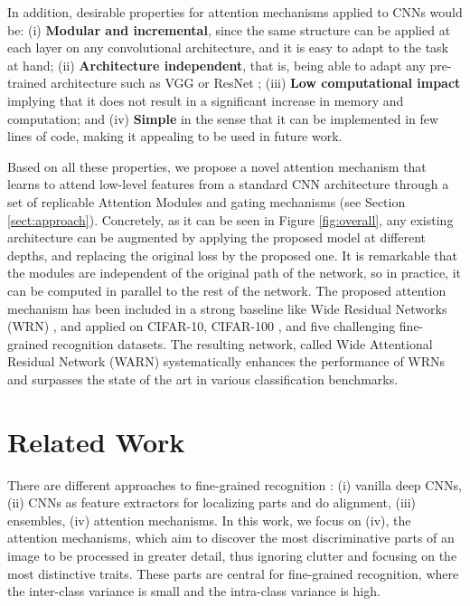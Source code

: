\documentclass[runningheads]{llncs}
\begin{document}
In addition, desirable properties for attention mechanisms applied to CNNs would be: (i) \textbf{Modular and incremental}, since the same structure can be applied at each layer on any convolutional architecture, and it is easy to adapt to the task at hand; (ii) \textbf{Architecture independent}, that is, being able to adapt any pre-trained architecture such as VGG \cite{simonyan2014very} or ResNet \cite{he2016deep}; (iii) \textbf{Low computational impact} implying that it does not result in a significant increase in memory and computation; and (iv) \textbf{Simple} in the sense that it can be implemented in few lines of code, making it appealing to be used in future work.

Based on all these properties, we propose a novel attention mechanism that learns to attend low-level features from a standard CNN architecture through a set of replicable Attention Modules and gating mechanisms (see Section \ref{sect:approach}). Concretely, as it can be seen in Figure \ref{fig:overall}, any existing architecture can be augmented by applying the proposed model at different depths, and replacing the original loss by the proposed one. It is remarkable that the modules are independent of the original path of the network, so in practice, it can be computed in parallel to the rest of the network. The proposed attention mechanism has been included in a strong baseline like Wide Residual Networks (WRN) \cite{Zagoruyko2016WRN}, and applied on CIFAR-10, CIFAR-100 \cite{krizhevsky2009learning}, and five challenging fine-grained recognition datasets. The resulting network, called Wide Attentional Residual Network (WARN) systematically enhances the performance of WRNs and surpasses the state of the art in various classification benchmarks.

\section{Related Work}
There are different approaches to fine-grained recognition \cite{zhao2017survey}: (i) vanilla deep CNNs, (ii) CNNs as feature extractors for localizing parts and do alignment, (iii) ensembles, (iv) attention mechanisms. In this work, we focus on (iv), the attention mechanisms, which aim to discover the most discriminative parts of an image to be processed in greater detail, thus ignoring clutter and focusing on the most distinctive traits. These parts are central for fine-grained recognition, where the inter-class variance is small and the intra-class variance is high.
\end{document}
